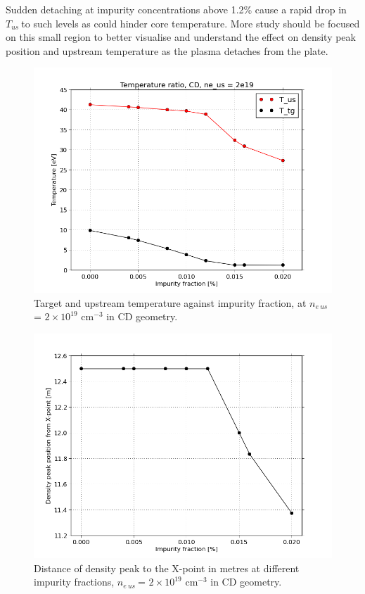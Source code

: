\documentclass[12pt]{article}  %
\providecommand{\noNe}[1]{{${#1}\times 10^{19}$ cm$^{-3}$}} %
\providecommand{\neus}{$n_{e~us}~$} %
\providecommand{\Tus}{$T_{us}~$} %
\begin{document}
Sudden detaching at impurity concentrations above 1.2\% cause a rapid drop in \Tus to such levels as could hinder core temperature. More study should be focused on this small region to better visualise and understand the effect on density peak position and upstream temperature as the plasma detaches from the plate.

\begin{figure}
	\includegraphics[scale=0.5]{Figures/sol1d/CvarTRne2.png}
	\centering
	\caption{Target and upstream temperature against impurity fraction, at \neus = \noNe{2} in CD geometry.}\label{figCvarTRne2}
\end{figure}



\begin{figure}
	\includegraphics[scale=0.5]{Figures/sol1d/CvarPMne2.png}
	\centering
	\caption{Distance of density peak to the X-point in metres at different impurity fractions, \neus = \noNe{2} in CD geometry.}\label{figCvarPMne2}
\end{figure}
\end{document}
